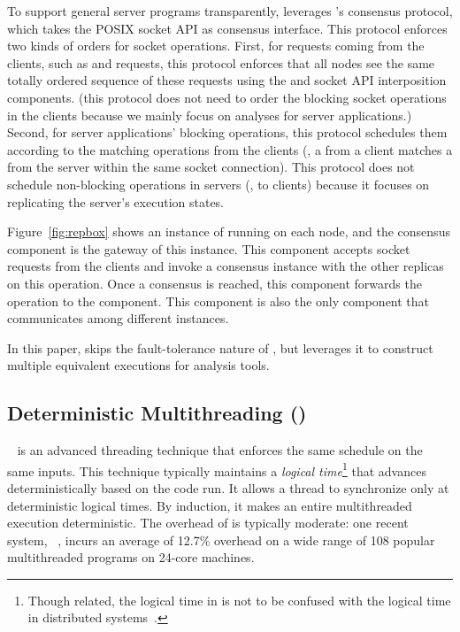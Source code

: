 To support general server programs transparently, \repbox leverages \repbox's 
\paxos consensus protocol, which takes the POSIX socket API as
consensus interface. This \paxos protocol enforces two kinds of 
orders for socket operations. First, for requests coming from the clients, 
such as \connect and \send requests, this protocol enforces that all nodes see 
the same totally ordered sequence of these requests using the \paxos and socket 
API interposition components.  (this protocol does not need to order the 
blocking socket operations in the clients because we mainly focus on analyses 
for server applications.) Second, for server applications' blocking operations, 
this \paxos protocol schedules them according to the matching operations from 
the clients (\eg, a \send from a client matches a \recv from the server within 
the same socket connection). This protocol does not schedule non-blocking 
operations in servers (\eg, \send to clients) because it focuses on replicating 
the server's execution states.



Figure~\ref{fig:repbox} shows an instance of \repbox running on 
each node, and the \paxos consensus component is the gateway of this instance.  This 
component accepts socket requests from the clients and invoke a \paxos 
consensus instance with the other replicas on this operation. Once a consensus 
is reached, this component forwards the operation to the \dmt component. This 
component is also the only \repbox component that communicates among different 
\repbox instances. 

In this paper, \xxx skips the fault-tolerance nature of \repbox, but leverages it 
to construct multiple equivalent executions for analysis tools.

\subsection{Deterministic Multithreading (\dmt)} \label{sec:dmt}

\dmt~\cite{dpj:oopsla09, 
dmp:asplos09, kendo:asplos09, coredet:asplos10, dos:osdi10, ddos:asplos13, 
ics:oopsla13} is an advanced threading technique that enforces the same 
schedule 
on the same inputs.  This technique typically maintains a \emph{logical
  time}\footnote{Though related, the logical time in \dmt is not to be
  confused with the logical time in distributed
  systems~\cite{lamportclock}.} that advances deterministically based on
the code run.  It allows a thread to synchronize only at deterministic
logical times.  By induction, it makes an entire multithreaded execution
deterministic.  The overhead of \dmt is typically moderate: one recent
\dmt system, \parrot~\cite{parrot:sosp13}, incurs an average of 12.7\%
overhead on a wide range of 108 popular multithreaded programs on 24-core
machines.

